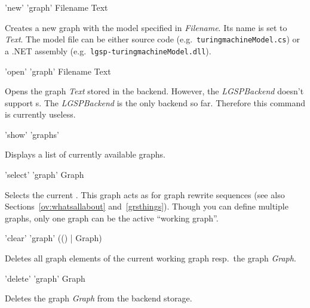 \begin{rail}
  'new' 'graph' Filename Text 
\end{rail}
Creates a new graph with the model specified in \emph{Filename}. Its name is set to \emph{Text}. The model file can be either source code (e.g.\ \texttt{turing\textunderscore machineModel.cs}) or a .NET assembly (e.g.\ \texttt{lgsp-turing\textunderscore machineModel.dll}).

\begin{rail}
  'open' 'graph' Filename Text
\end{rail}
Opens the graph \emph{Text} stored in the backend. However, the \emph{LGSPBackend} doesn't support s. The \emph{LGSPBackend} is the only backend so far. Therefore this command is currently useless.

\begin{rail}
  'show' 'graphs'
\end{rail}
Displays a list of currently available graphs.

\begin{rail}
  'select' 'graph' Graph
\end{rail}
Selects the current . This graph acts as \emph{} for graph rewrite sequences (see also Sections~\ref{ov:whatsallabout} and~\ref{grsthings}). Though you can define multiple graphs, only one graph can be the active ``working graph''.

\begin{rail}
  'clear' 'graph' (() | Graph)
\end{rail}
Deletes all graph elements of the current working graph resp.\ the graph \emph{Graph}.

\begin{rail}
  'delete' 'graph' Graph
\end{rail}
Deletes the graph \emph{Graph} from the backend storage.

